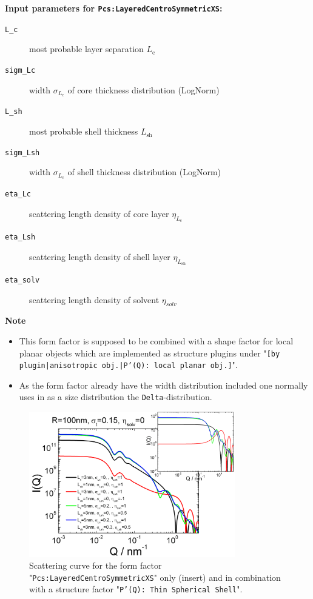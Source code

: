 \noindent
\textbf{Input parameters for \texttt{Pcs:LayeredCentroSymmetricXS}:}
\begin{description}
    \item[\texttt{L\_c}] most probable layer separation $L_\textrm{c}$
    \item[\texttt{sigm\_Lc}] width $\sigma_{L_\textrm{c}}$ of core thickness distribution (LogNorm)
    \item[\texttt{L\_sh}] most probable shell thickness $L_\textrm{sh}$
    \item[\texttt{sigm\_Lsh}] width $\sigma_{L_\textrm{c}}$ of shell thickness distribution (LogNorm)
    \item[\texttt{eta\_Lc}] scattering length density of core layer $\eta_{L_\textrm{c}}$
    \item[\texttt{eta\_Lsh}] scattering length density of shell layer $\eta_{L_\textrm{sh}}$
    \item[\texttt{eta\_solv}] scattering length density of solvent $\eta_{solv}$
\end{description}

\noindent
\textbf{Note}
\begin{itemize}
  \item This form factor is supposed to be combined with a shape factor for
local planar objects which are implemented as structure  plugins
under "\texttt{[by plugin|anisotropic obj.|P'(Q): local planar
obj.]}".
\item As the form factor already have the width distribution included one normally uses in \SASfit as a size distribution
the \texttt{Delta}-distribution.
\end{itemize}

\begin{figure}[htb]
\begin{center}
\includegraphics[width=0.8\textwidth,height=0.55\textwidth]{../images/form_factor/anisotropic/Pcs_planar2centrosymmIQ.png}
\end{center}
\caption{Scattering curve for the form factor "\texttt{Pcs:LayeredCentroSymmetricXS}" only (insert) and
in combination with a structure factor "\texttt{P'(Q): Thin Spherical Shell}".}
\label{fig:Pcs_planar2centrosymmIQ}
\end{figure}

